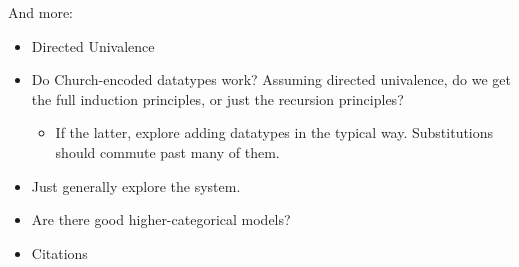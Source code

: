 \documentclass{article}
\begin{document}
\pagebreak

\listoftodos

\noindent And more:

\begin{itemize}
    \item Directed Univalence
    \item Do Church-encoded datatypes work? Assuming directed univalence, do we get the full induction principles, or just the recursion principles?
    \begin{itemize}
        \item If the latter, explore adding datatypes in the typical way. Substitutions should commute past many of them.
    \end{itemize}
    \item Just generally explore the system.
    \item Are there good higher-categorical models?
    \item Citations
\end{itemize}

\printbibliography
\end{document}
